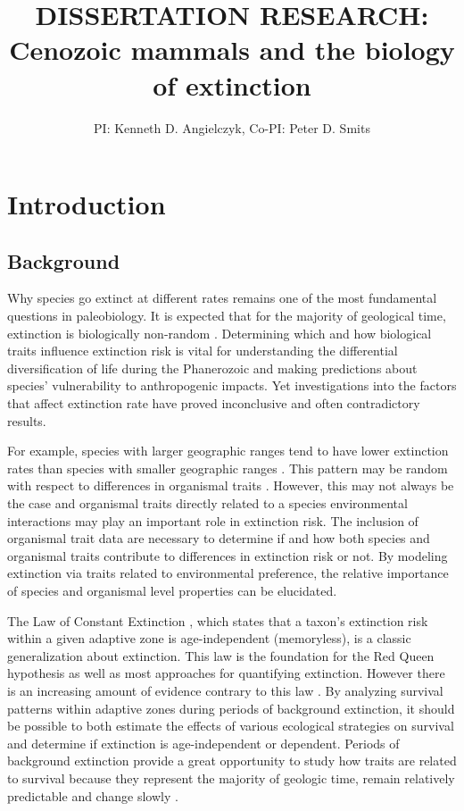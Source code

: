 \documentclass[11pt,letterpaper]{article}
\title{\uppercase{Dissertation Research:}\\ Cenozoic mammals and the biology of extinction}
\author{PI: Kenneth D. Angielczyk, Co-PI: Peter D. Smits}
\date{}
\begin{document}

\setcounter{secnumdepth}{0}

\maketitle


\section{Introduction}
\subsection{Background}
Why species go extinct at different rates remains one of the most fundamental questions in paleobiology. It is expected that for the majority of geological time, extinction is biologically non-random \citep{Jablonski1986,Alexander1977,Harnik2011,Johnson2002b,Kitchell1986,Nurnberg2013a,Payne2007}. Determining which and how biological traits influence extinction risk is vital for understanding the differential diversification of life during the Phanerozoic and making predictions about species' vulnerability to anthropogenic impacts. Yet investigations into the factors that affect extinction rate have proved inconclusive and often contradictory results.

For example, species with larger geographic ranges tend to have lower extinction rates than species with smaller geographic ranges \citep{Jablonski1986,Harnik2013,Nurnberg2013a,Jablonski2003,Roy2009c}. This pattern may be random with respect to differences in organismal traits \citep{Raup1991b}. However, this may not always be the case and organismal traits directly related to a species environmental interactions may play an important role in extinction risk.  The inclusion of organismal trait data are necessary to determine if and how both species and organismal traits contribute to differences in extinction risk or not. By modeling extinction via traits related to environmental preference, the relative importance of species and organismal level properties can be elucidated.

The Law of Constant Extinction \citep{VanValen1973}, which states that a taxon's extinction risk within a given adaptive zone is age-independent (memoryless), is a classic generalization about extinction. This law is the foundation for the Red Queen hypothesis as well as most approaches for quantifying extinction. However there is an increasing amount of evidence contrary to this law \citep{Drake2014,Raup1975,Sepkoski1975,Finnegan2008}. By analyzing survival patterns within adaptive zones during periods of background extinction, it should be possible to both estimate the effects of various ecological strategies on survival and determine if extinction is age-independent or dependent. Periods of background extinction provide a great opportunity to study how traits are related to survival because they represent the majority of geologic time, remain relatively predictable and change slowly \citep{Jablonski1986,Raup1988}. 
\end{document}

